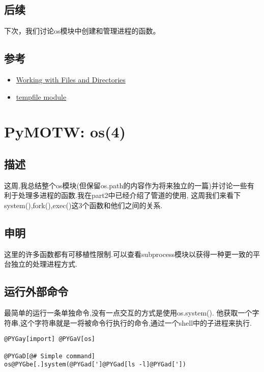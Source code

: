 \documentclass[a4paper,10pt,english]{manual}
\begin{document}
\section{后续}

下次，我们讨论os模块中创建和管理进程的函数。


\section{参考}
\begin{itemize}
\item {} 
\href{http://docs.python.org/lib/os-file-dir.html}{Working with Files and Directories}

\item {} 
\href{http://docs.python.org/lib/module-tempfile.html}{tempfile module}

\end{itemize}

\resetcurrentobjects


\chapter{PyMOTW: os(4)}


\section{描述}

这周,我总结整个os模块(但保留os.path的内容作为将来独立的一篇)并讨论一些有利于处理多进程的函数.我在part2中已经介绍了管道的使用, 这周我们来看下system(),fork(),exec()这3个函数和他们之间的关系.


\section{申明}

这里的许多函数都有可移植性限制.可以查看subprocess模块以获得一种更一致的平台独立的处理进程方式.


\section{运行外部命令}

最简单的运行一条单独命令,没有一点交互的方式是使用os.system(). 他获取一个字符串,这个字符串就是一将被命令行执行的命令,通过一个shell中的子进程来执行.

\begin{Verbatim}[commandchars=@\[\]]
@PYGay[import] @PYGaV[os]

@PYGaD[@# Simple command]
os@PYGbe[.]system(@PYGad[']@PYGad[ls -l]@PYGad['])
\end{Verbatim}
\end{document}
